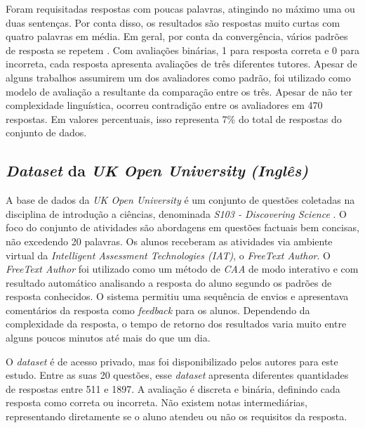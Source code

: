 Foram requisitadas respostas com poucas palavras, atingindo no máximo uma ou duas sentenças. Por conta disso, os resultados são respostas muito curtas com quatro palavras em média. Em geral, por conta da convergência, vários padrões de resposta se repetem \cite{riordan2017}. Com avaliações binárias, 1 para resposta correta e 0 para incorreta, cada resposta apresenta avaliações de três diferentes tutores. Apesar de alguns trabalhos assumirem um dos avaliadores como padrão, foi utilizado como modelo de avaliação a resultante da comparação entre os três. Apesar de não ter complexidade linguística, ocorreu contradição entre os avaliadores em 470 respostas. Em valores percentuais, isso representa 7\% do total de respostas do conjunto de dados.

\subsection{\textit{Dataset} da \textit{UK Open University} \textit{(Inglês)}}
\label{openunv-db}

A base de dados da \textit{UK Open University} é um conjunto de questões coletadas na disciplina de introdução a ciências, denominada \textit{S103 - Discovering Science} \cite{jordan2012}. O foco do conjunto de atividades são abordagens em questões factuais bem concisas, não excedendo 20 palavras. Os alunos receberam as atividades via ambiente virtual da \textit{Intelligent Assessment Technologies (IAT)}, o \textit{FreeText Author}. O \textit{FreeText Author} foi utilizado como um método de \textit{CAA} de modo interativo e com resultado automático analisando a resposta do aluno segundo os padrões de resposta conhecidos. O sistema permitiu uma sequência de envios e apresentava comentários da resposta como \textit{feedback} para os alunos. Dependendo da complexidade da resposta, o tempo de retorno dos resultados varia muito entre alguns poucos minutos até mais do que um dia.

O \textit{dataset} é de acesso privado, mas foi disponibilizado pelos autores para este estudo. Entre as suas 20 questões, esse \textit{dataset} apresenta diferentes quantidades de respostas entre 511 e 1897. A avaliação é discreta e binária, definindo cada resposta como correta ou incorreta. Não existem notas intermediárias, representando diretamente se o aluno atendeu ou não os requisitos da resposta. 


